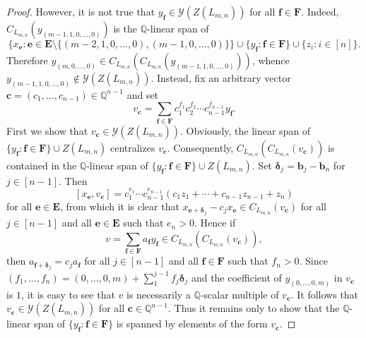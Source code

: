 \documentclass[11pt,a4paper]{amsart}
\theoremstyle{plain}
\theoremstyle{remark}
\newcommand{\Q}{\mathbb{Q}}
\begin{document}
\begin{proof}
However, it is not true that $y_{\mathbf{f}} \in \mathcal{Y}(Z(L_{m,n}))$ for all $\mathbf{f} \in \mathbf{F}$.  Indeed, 
$C_{L_{m,n}}(y_{(m-1,1,0,\dots,0)})$ is the $\Q$-linear span of 
$$\{ x_{\mathbf{e}} : \mathbf{e} \in \mathbf{E} \setminus \{ (m-2, 1, 0, \dots, 0), (m-1,0,\dots,0) \} \} \cup \{ y_{\mathbf{f}} : \mathbf{f} \in \mathbf{F} \} \cup \{z_i : i \in [n] \}.$$  
Therefore $y_{(m,0,\dots, 0)} \in C_{L_{m,n}} (C_{L_{m,n}} (y_{(m-1, 1, 0, \dots, 0)}))$, whence $y_{(m-1,1,0, \dots, 0)} \not\in \mathcal{Y}(Z(L_{m,n}))$.
Instead, fix an arbitrary vector $\mathbf{c} = (c_1, \dots, c_{n-1}) \in \Q^{n-1}$ and set
$$ v_{\mathbf{c}} = \sum_{\mathbf{f} \in \mathbf{F}} c_1^{f_1} c_2^{f_2} \cdots c_{n-1}^{f_{n-1}} y_{\mathbf{f}}.$$
First we show that $v_{\mathbf{c}} \in \mathcal{Y}(Z(L_{m,n}))$.  Obviously, the linear span of $\{ y_{\mathbf{f}} : \mathbf{f} \in \mathbf{F} \} \cup Z(L_{m,n})$ centralizes $v_{\mathbf{c}}$.  Consequently, $C_{L_{m,n}}(C_{L_{m,n}}(v_{\mathbf{c}}))$ is contained in the $\Q$-linear span of $\{ y_{\mathbf{f}} : \mathbf{f} \in \mathbf{F} \} \cup Z(L_{m,n})$.  Set $\boldsymbol{\delta}_j = \mathbf{b}_j - \mathbf{b}_n$ for $j \in [n-1]$.  Then 
$$ [x_{\mathbf{e}}, v_\mathbf{c}] = c_1^{e_1} \cdots c_{n-1}^{e_{n-1}} (c_1 z_1 + \cdots + c_{n-1} z_{n-1} + z_n)$$
for all $\mathbf{e} \in \mathbf{E}$,
from which it is clear that $x_{\mathbf{e} + \boldsymbol{\delta}_j} - c_j x_{\mathbf{e}} \in C_{L_{m,n}}(v_\mathbf{c})$ for all $j \in [n-1]$ and all $\mathbf{e} \in \mathbf{E}$ such that $e_n > 0$.  
Hence if 
$$ v = \sum_{\mathbf{f} \in \mathbf{F}} a_{\mathbf{f}} y_{\mathbf{f}} \in C_{L_{m,n}}(C_{L_{m,n}}(v_{\mathbf{c}})),$$
then $a_{\mathbf{f} + \boldsymbol{\delta}_j} = c_j a_{\mathbf{f}}$ for all $j \in [n-1]$ and all $\mathbf{f} \in \mathbf{F}$ such that $f_n > 0$.  Since $(f_1, \dots, f_n) = (0,\dots, 0,m) + \sum_1^{j-1} f_j \boldsymbol{\delta}_j$ and the coefficient of $y_{(0, \dots, 0,m)}$ in $v_{\mathbf{c}}$ is $1$, it is easy to see that $v$ is necessarily a $\Q$-scalar multiple of $v_{\mathbf{c}}$.  It follows that $v_{\mathbf{c}} \in \mathcal{Y}(Z(L_{m,n}))$ for all $\mathbf{c} \in \Q^{n-1}$.  Thus it remains only to show that the $\Q$-linear span of $\{ y_{\mathbf{f}} : \mathbf{f} \in \mathbf{F} \}$ is spanned by elements of the form $v_{\mathbf{c}}$.


\end{proof}
\end{document}
